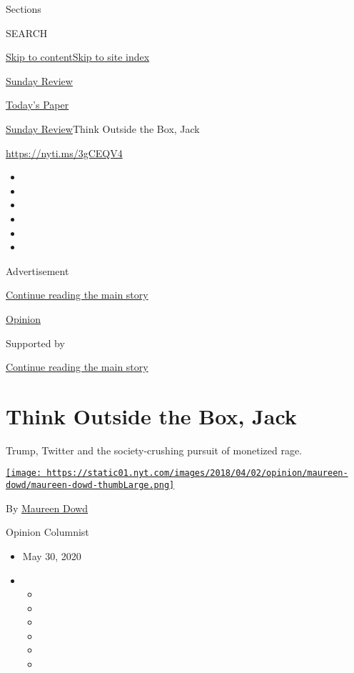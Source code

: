 Sections

SEARCH

\protect\hyperlink{site-content}{Skip to
content}\protect\hyperlink{site-index}{Skip to site index}

\href{https://www.nytimes.com/section/opinion/sunday}{Sunday Review}

\href{https://myaccount.nytimes.com/auth/login?response_type=cookie\&client_id=vi}{}

\href{https://www.nytimes.com/section/todayspaper}{Today's Paper}

\href{/section/opinion/sunday}{Sunday Review}\textbar{}Think Outside the
Box, Jack

\href{https://nyti.ms/3gCEQV4}{https://nyti.ms/3gCEQV4}

\begin{itemize}
\item
\item
\item
\item
\item
\item
\end{itemize}

Advertisement

\protect\hyperlink{after-top}{Continue reading the main story}

\href{/section/opinion}{Opinion}

Supported by

\protect\hyperlink{after-sponsor}{Continue reading the main story}

\hypertarget{think-outside-the-box-jack}{%
\section{Think Outside the Box, Jack}\label{think-outside-the-box-jack}}

Trump, Twitter and the society-crushing pursuit of monetized rage.

\href{https://www.nytimes.com/by/maureen-dowd}{\texttt{[image: https://static01.nyt.com/images/2018/04/02/opinion/maureen-dowd/maureen-dowd-thumbLarge.png]}}

By \href{https://www.nytimes.com/by/maureen-dowd}{Maureen Dowd}

Opinion Columnist

\begin{itemize}
\item
  May 30, 2020
\item
  \begin{itemize}
  \item
  \item
  \item
  \item
  \item
  \item
  \end{itemize}
\end{itemize}

